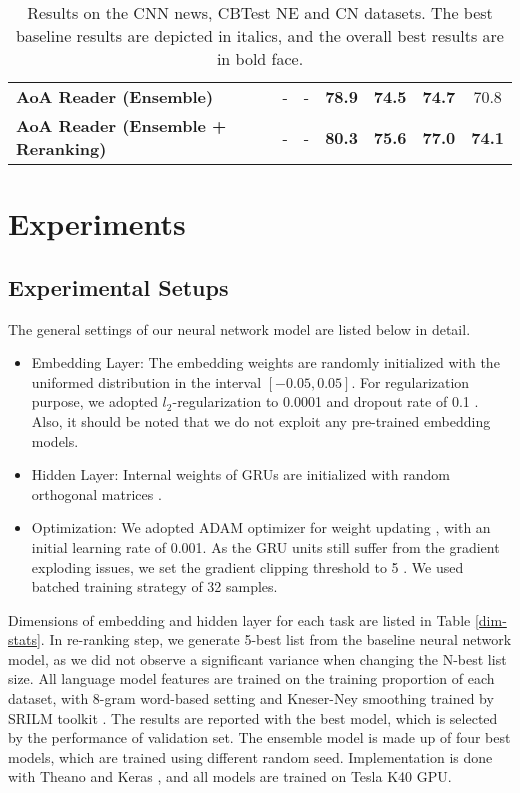 \documentclass[11pt,a4paper]{article}
\begin{document}
\begin{table*}[h]
\begin{center}
\begin{tabular}{lcccccc}
        \hline
        {\bf AoA Reader (Ensemble)} & - & - & {\bf 78.9} & {\bf 74.5} & {\bf 74.7} &  70.8 \\
        {\bf AoA Reader (Ensemble + Reranking)} & - & - & {\bf 80.3} & {\bf 75.6} & {\bf 77.0} &  {\bf 74.1} \\
        \bottomrule
        \end{tabular}
        \end{center}
        \caption{\label{public-result} Results on the CNN news, CBTest NE and CN datasets. The best baseline results are depicted in italics, and the overall best results are in bold face. 
         }
        \end{table*}
        
\section{Experiments}\label{experiments}

\subsection{Experimental Setups} 
        
The general settings of our neural network model are listed below in detail.

\begin{itemize}
  \item Embedding Layer: The embedding weights are randomly initialized with the uniformed distribution in the interval $[-0.05,0.05]$. For regularization purpose, we adopted $l_2$-regularization to 0.0001 and dropout rate of 0.1 \cite{srivastava-etal-2014}. Also, it should be noted that we do not exploit any pre-trained embedding models.
  \item Hidden Layer: Internal weights of GRUs are initialized with random orthogonal matrices \cite{saxe2013exact}.
  \item Optimization: We adopted ADAM optimizer for weight updating \cite{kingma2014adam}, with an initial learning rate of 0.001. As the GRU units still suffer from the gradient exploding issues, we set the gradient clipping threshold to 5 \cite{pascanu-etal-2013}. We used batched training strategy of 32 samples.
\end{itemize}

Dimensions of embedding and hidden layer for each task are listed in Table \ref{dim-stats}.
In re-ranking step, we generate 5-best list from the baseline neural network model, as we did not observe a significant variance when changing the N-best list size.
All language model features are trained on the training proportion of each dataset, with 8-gram word-based setting and Kneser-Ney smoothing \cite{kneser-1995} trained by SRILM toolkit \cite{stolcke-2002}.
The results are reported with the best model, which is selected by the performance of validation set.
The ensemble model is made up of four best models, which are trained using different random seed.
Implementation is done with Theano \cite{theano2016} and Keras \cite{chollet2015keras}, and all models are trained on Tesla K40 GPU.
\end{document}
